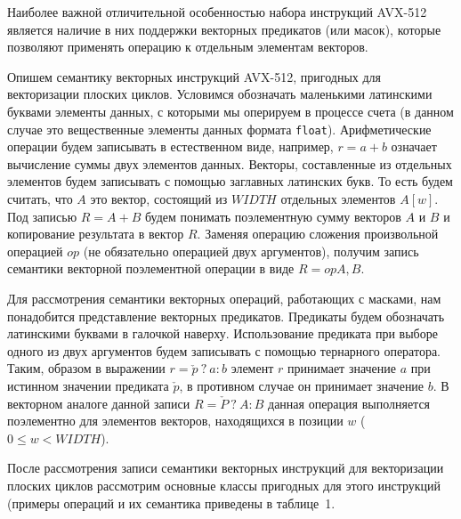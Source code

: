 \documentclass[
11pt,%
tightenlines,%
twoside,%
onecolumn,%
nofloats,%
nobibnotes,%
nofootinbib,%
superscriptaddress,%
noshowpacs,%
centertags]%
{revtex4}
\begin{document}
Наиболее важной отличительной особенностью набора инструкций AVX-512 является наличие в них поддержки векторных предикатов (или масок), которые позволяют применять операцию к отдельным элементам векторов.

Опишем семантику векторных инструкций AVX-512, пригодных для векторизации плоских циклов.
Условимся обозначать маленькими латинскими буквами элементы данных, с которыми мы оперируем в процессе счета (в данном случае это вещественные элементы данных формата \texttt{float}).
Арифметические операции будем записывать в естественном виде, например, $r = a + b$ означает вычисление суммы двух элементов данных.
Векторы, составленные из отдельных элементов будем записывать с помощью заглавных латинских букв.
То есть будем считать, что $A$ это вектор, состоящий из $WIDTH$ отдельных элементов $A[w]$.
Под записью $R = A + B$ будем понимать поэлементную сумму векторов $A$ и $B$ и копирование результата в вектор $R$.
Заменяя операцию сложения произвольной операцией $op$ (не обязательно операцией двух аргументов), получим запись семантики векторной поэлементной операции в виде $R = op A, B$.

Для рассмотрения семантики векторных операций, работающих с масками, нам понадобится представление векторных предикатов.
Предикаты будем обозначать латинскими буквами в галочкой наверху.
Использование предиката при выборе одного из двух аргументов будем записывать с помощью тернарного оператора.
Таким, образом в выражении $r = \check{p} \ ? \ a : b$ элемент $r$ принимает значение $a$ при истинном значении предиката $\check{p}$, в противном случае он принимает значение $b$.
В векторном аналоге данной записи $R = \check{P} \ ? \ A : B$ данная операция выполняется поэлементно для элементов векторов, находящихся в позиции $w$ ($0 \le w < WIDTH$).

После рассмотрения записи семантики векторных инструкций для векторизации плоских циклов рассмотрим основные классы пригодных для этого инструкций (примеры операций и их семантика приведены в таблице~1.
\end{document}
